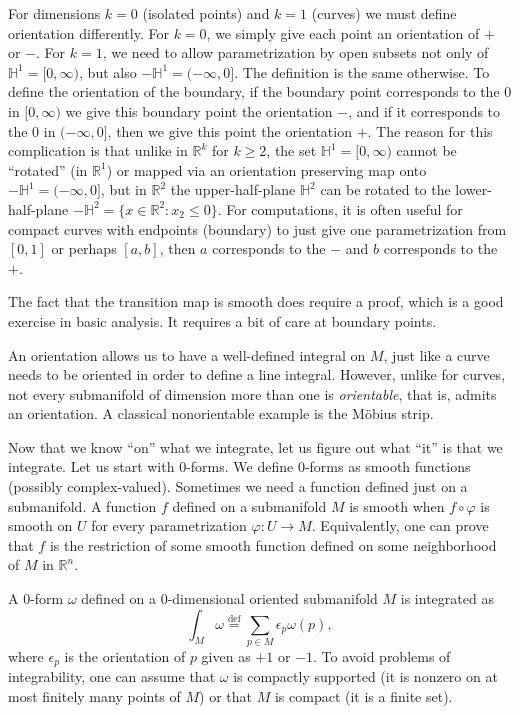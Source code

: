 \documentclass[12pt,openany]{book}
\newcommand{\R}{{\mathbb{R}}}
\newcommand{\bH}{{\mathbb{H}}}
\theoremstyle{plain}
\theoremstyle{remark}
\theoremstyle{definition}
\theoremstyle{exercise}
\theoremstyle{example}
\begin{document}
For dimensions $k=0$ (isolated points) and $k=1$ (curves) we must define
orientation differently.  For $k=0$, we simply give each point an
orientation of $+$ or $-$.  For $k=1$, we need to allow parametrization by
open subsets not only of $\bH^1 = [0,\infty)$, but also $-\bH^1 = (-\infty,0]$.
The definition is the same otherwise.  To define the orientation
of the boundary, if the boundary point corresponds to the $0$ in
$[0,\infty)$ we give this boundary point the orientation
$-$, and if it corresponds to the $0$ in $(-\infty,0]$, then
we give this point the orientation $+$.  The reason for this complication is
that unlike in $\R^k$ for $k \geq 2$, the set $\bH^1 = [0,\infty)$ cannot be
``rotated'' (in $\R^1$) or mapped via an orientation preserving map onto
$-\bH^1 = (-\infty,0]$, but in $\R^2$ the upper-half-plane $\bH^2$ can
be rotated to the lower-half-plane $-\bH^2 = \{ x \in \R^2 : x_2 \leq 0 \}$.
For computations, it is often useful for compact curves
with endpoints (boundary) to just give one
parametrization from $[0,1]$ or perhaps $[a,b]$, then $a$ corresponds to the
$-$ and $b$ corresponds to the $+$.

The fact that the transition map is smooth does require a proof, which is a
good exercise in basic analysis.  It requires a bit of care at boundary
points.

An orientation allows us to have a well-defined integral on $M$, just
like a curve needs to be oriented in order to define a line integral.
However, unlike for curves, not every submanifold of dimension
more than one is \emph{orientable}, that is, admits an orientation.
A classical nonorientable example is the M\"obius strip.

\medskip

Now that we know ``on'' what we integrate, let us figure out what ``it'' is
that we integrate.  Let us start with $0$-forms.
We define $0$-forms as smooth functions (possibly complex-valued).
Sometimes we need a function defined just on a submanifold.  A function $f$ defined
on a submanifold $M$ is smooth when $f \circ \varphi$ is smooth on $U$
for every parametrization $\varphi \colon U \to M$.  Equivalently,
one can prove that $f$ is the restriction of some smooth function
defined on some neighborhood of $M$ in $\R^n$.

A $0$-form $\omega$ defined on a $0$-dimensional oriented submanifold $M$
is integrated as
\begin{equation*}
\int_M \omega
\overset{\text{def}}{=}
\sum_{p \in M} \epsilon_p \omega(p) ,
\end{equation*}
where $\epsilon_p$ is the orientation of $p$ given as $+1$ or $-1$.
To avoid problems of integrability,
one can assume that $\omega$ is compactly supported (it is
nonzero on at most finitely many points of $M$) or that $M$ is compact (it
is a finite set).
\end{document}
